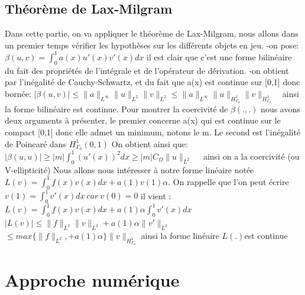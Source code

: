 \documentclass[a4paper,french,10pt]{article}
\begin{document}
\newpage\subsection{Théorème de Lax-Milgram}
Dans cette partie, on va appliquer le théorème de Lax-Milgram, nous allons dans un premier temps vérifier les hypothèses sur les différents objets en jeu.
\newline\newline -on pose:
$ \beta (u,v)=\int_{0}^{1}a(x)u'(x)v'(x)dx $ il est clair que c'est une forme bilinéaire du fait des propriétés de l'intégrale et de l'opérateur de dérivation.
\newline\newline -on obtient par l'inégalité de Cauchy-Schwartz, et du fait que a(x) est continue sur [0,1] donc bornée:
\newline\newline $ |\beta (u,v)|\leq \| a \|_{L^\infty} \|u\parallel_{L^2} \| v \|_{L^2} \leq \| a \|_{L^\infty} \|u\|_{H_{\Gamma_{0}}^{1}} \| v \|_{H_{\Gamma_{0}}^{1}} $~~ainsi la forme bilinéaire est continue.
\newline\newline Pour montrer la coercivité de $\beta(.,.)$ nous avons deux arguments à présenter, le premier concerne a(x) qui est continue sur le compact [0,1] donc elle admet un minimum, notons le m.
Le second est l'inégalité de Poincaré dans $H_{\Gamma_{0}}^{1}(0,1)$ On obtient ainsi que:
\newline\newline $ |\beta (u,u)|\geq |m|\int_{0}^{1}(u'(x))^2 dx \geq |m|C_{\Omega} \|u\|_{L^2}$~~ ainsi on a la coercivité (ou V-ellipticité)
\newline\newline Nous allons nous intéresser à notre forme linéaire notée $L(v)=\int_{0}^{1}f(x)v(x)dx+a(1)v(1)\alpha$.
\newline On rappelle que l'on peut écrire $v(1)=\int_{0}^{1} v'(x)dx~car~v(0)=0 $
il vient :  $L(v)=\int_{0}^{1}f(x)v(x)dx+a(1)\alpha\int_{0}^{1} v'(x)dx$ 
\newline \newline $|L(v)| \leq \| f \|_{L^2} \| v \|_{L^2} +a(1) \alpha \| v'\|_{L^2}$
\newline\newline $\leq max\{ \| f \|_{L^2} ,+a(1)\alpha \} \| v \|_{H_{\Gamma_{0}}^{1}} $ ainsi la forme linéaire $L(.)$est continue 
\newpage\section{Approche numérique}
\end{document}
